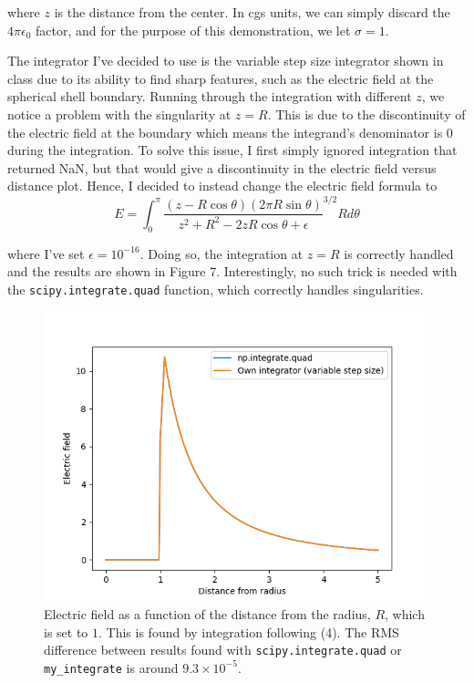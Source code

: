\documentclass{article}
\begin{document}
where $z$ is the distance from the center. In cgs units, we can simply discard the $4 \pi \epsilon_0$ factor, and for the purpose of this demonstration, we let $\sigma = 1$.

The integrator I've decided to use is the variable step size integrator shown in class due to its ability to find sharp features, such as the electric field at the spherical shell boundary. Running through the integration with different $z$, we notice a problem with the singularity at $z = R$. This is due to the discontinuity of the electric field at the boundary which means the integrand's denominator is 0 during the integration. To solve this issue, I first simply ignored integration that returned NaN, but that would give a discontinuity in the electric field versus distance plot. Hence, I decided to instead change the electric field formula to
\begin{equation}
    E = \int_0^\pi \frac{(z - R \cos \theta)(2 \pi R \sin \theta)}{z^2 + R^2 - 2 z R \cos \theta + \epsilon}^{3/2} R d\theta
\end{equation}

where I've set $\epsilon = 10^{-16}$. Doing so, the integration at $z = R$ is correctly handled and the results are shown in Figure 7. Interestingly, no such trick is needed with the \verb|scipy.integrate.quad| function, which correctly handles singularities.
\begin{figure}[h]
    \centering
    \includegraphics[scale=0.8]{images/prob4_electric_field.png}
    \cprotect\caption{Electric field as a function of the distance from the radius, $R$, which is set to $1$. This is found by integration following (4). The RMS difference between results found with \verb|scipy.integrate.quad| or \verb|my_integrate| is around $9.3 \times 10^{-5}$.}
\end{figure}
\end{document}
